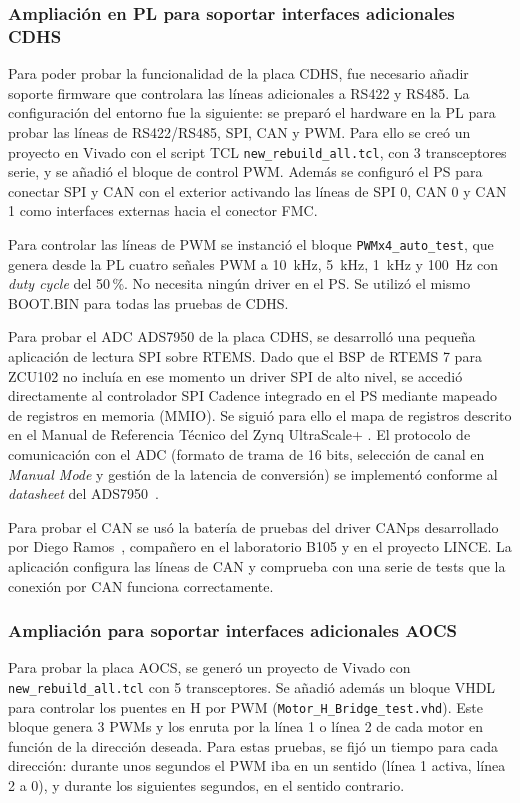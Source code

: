 \subsubsection{Ampliación en PL para soportar interfaces adicionales CDHS}

Para poder probar la funcionalidad de la placa CDHS, fue necesario añadir soporte firmware
que controlara las líneas adicionales a RS422 y RS485. La configuración del entorno fue la
siguiente: se preparó el hardware en la PL para probar las líneas de RS422/RS485, SPI, CAN
y PWM. Para ello se creó un proyecto en Vivado con el script TCL \texttt{new\_rebuild\_all.tcl},
con 3 transceptores serie, y se añadió el bloque de control PWM. Además se configuró el PS para
conectar SPI y CAN con el exterior activando las líneas de SPI 0, CAN 0 y CAN 1 como
interfaces externas hacia el conector FMC.

Para controlar las líneas de PWM se instanció el bloque \texttt{PWMx4\_auto\_test}, que genera
desde la PL cuatro señales PWM a 10~kHz, 5~kHz, 1~kHz y 100~Hz con \textit{duty cycle} del
50\,\%. No necesita ningún driver en el PS. Se utilizó el mismo BOOT.BIN para todas las
pruebas de CDHS.

Para probar el ADC ADS7950 de la placa CDHS, se desarrolló una pequeña aplicación de
lectura SPI sobre RTEMS. Dado que el BSP de RTEMS 7 para ZCU102 no incluía en ese
momento un driver SPI de alto nivel, se accedió directamente al controlador SPI Cadence
integrado en el PS mediante mapeado de registros en memoria (MMIO). Se siguió para ello el
mapa de registros descrito en el Manual de Referencia Técnico del Zynq UltraScale+
\cite{xilinx2023ug1085}. El protocolo de comunicación con el ADC (formato de trama de
16 bits, selección de canal en \textit{Manual Mode} y gestión de la latencia de conversión) se
implementó conforme al \textit{datasheet} del ADS7950~\cite{ti2018ads7950}.

Para probar el CAN se usó la batería de pruebas del driver CANps desarrollado por Diego
Ramos~\cite{ramos2026can}, compañero en el laboratorio B105 y en el proyecto LINCE. La aplicación
configura las líneas de CAN y comprueba con una serie de tests que la conexión por CAN funciona
correctamente.

\subsubsection{Ampliación para soportar interfaces adicionales AOCS}

Para probar la placa AOCS, se generó un proyecto de Vivado con \texttt{new\_rebuild\_all.tcl} con
5 transceptores. Se añadió además un bloque VHDL para controlar los puentes en H por PWM
(\texttt{Motor\_H\_Bridge\_test.vhd}). Este bloque genera 3 PWMs y los enruta por la línea 1 o
línea 2 de cada motor en función de la dirección deseada. Para estas pruebas, se fijó un
tiempo para cada dirección: durante unos segundos el PWM iba en un sentido (línea 1 activa,
línea 2 a 0), y durante los siguientes segundos, en el sentido contrario.

